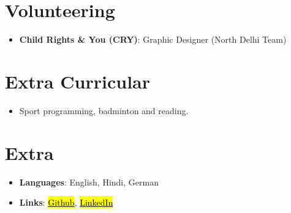 \documentclass[letterpaper,10.5pt]{article}
\makeatletter
\newcommand{\resumeItem}[2]{
  \item\normalsize{
    \textbf{#1}{#2}
  }
}
\newcommand{\resumeSubheading}[4]{
  \vspace{-1pt}\item
    \begin{tabular*}{0.97\textwidth}{l@{\extracolsep{\fill}}r}
      \textbf{#1} & {\small #2} \\
      \textit{\normalsize#3} & {\normalsize #4} \\
    \end{tabular*}\vspace{-5pt}
}
\newcommand{\resumeSubItem}[2]{\resumeItem{#1}{#2}\vspace{-4pt}}
\newcommand{\resumeSubHeadingListStart}{\begin{itemize}[leftmargin=*]}
\newcommand{\resumeSubHeadingListEnd}{\end{itemize}}
\newcommand{\resumeItemListStart}{\begin{itemize}}
\newcommand{\resumeItemListEnd}{\end{itemize}\vspace{-5pt}}
\makeatother
\begin{document}

\section{Volunteering}
  \resumeSubHeadingListStart
        \resumeSubItem{Child Rights \& You (CRY)}
        {:    Graphic Designer (North Delhi Team)}
        
    \resumeSubHeadingListEnd
    
\section{Extra Curricular}
    \resumeSubHeadingListStart
        \resumeSubItem{}
        {Sport programming, badminton and reading.}
    
    \resumeSubHeadingListEnd
    
\section{Extra}
    \resumeSubHeadingListStart
        \resumeSubItem{Languages}
        {:    English, Hindi, German}
            
        \resumeSubItem{Links}
        {:    
        \href{https://github.com/prakashdanish}{\hl{Github}},         
        \href{https://www.linkedin.com/in/prakashdanish/}{\hl{LinkedIn}}}
        
    \resumeSubHeadingListEnd
    
    
\end{document}
